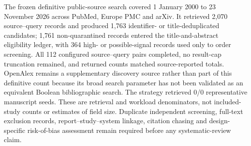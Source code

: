 The frozen definitive public-source search covered 1 January 2000 to 23 November 2026 across PubMed, Europe PMC and arXiv. It retrieved 2,070 source--query records and produced 1,763 identifier- or title-deduplicated candidates; 1,761 non-quarantined records entered the title-and-abstract eligibility ledger, with 364 high- or possible-signal records used only to order screening. All 112 configured source--query pairs completed, no result-cap truncation remained, and returned counts matched source-reported totals. OpenAlex remains a supplementary discovery source rather than part of this definitive count because its broad search parameter has not been validated as an equivalent Boolean bibliographic search. The strategy retrieved 0/0 representative manuscript seeds. These are retrieval and workload denominators, not included-study counts or estimates of field size. Duplicate independent screening, full-text exclusion records, report--study--system linkage, citation chasing and design-specific risk-of-bias assessment remain required before any systematic-review claim.
